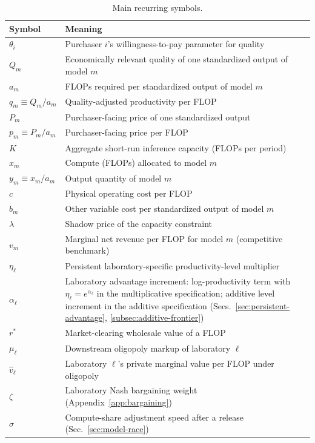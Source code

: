\documentclass[11pt]{article}
\begin{document}
\begin{table}[htbp]
\centering
\caption{Main recurring symbols.}
\label{tab:notation}
\begin{tabular}{l>{\raggedright\arraybackslash}p{4.4in}}
\hline
Symbol & Meaning \\
\hline
$\theta_i$ & Purchaser $i$'s willingness-to-pay parameter for quality \\
$Q_m$ & Economically relevant quality of one standardized output of model $m$ \\
$a_m$ & FLOPs required per standardized output of model $m$ \\
$q_m\equiv Q_m/a_m$ & Quality-adjusted productivity per FLOP \\
$P_m$ & Purchaser-facing price of one standardized output \\
$p_m\equiv P_m/a_m$ & Purchaser-facing price per FLOP \\
$K$ & Aggregate short-run inference capacity (FLOPs per period) \\
$x_m$ & Compute (FLOPs) allocated to model $m$ \\
$y_m\equiv x_m/a_m$ & Output quantity of model $m$ \\
$c$ & Physical operating cost per FLOP \\
$b_m$ & Other variable cost per standardized output of model $m$ \\
$\lambda$ & Shadow price of the capacity constraint \\
$v_m$ & Marginal net revenue per FLOP for model $m$ (competitive benchmark) \\
$\eta_\ell$ & Persistent laboratory-specific productivity-level multiplier \\
$\alpha_\ell$ & Laboratory advantage increment: log-productivity term with $\eta_\ell=e^{\alpha_\ell}$ in the multiplicative specification; additive level increment in the additive specification (Secs.~\ref{sec:persistent-advantage}, \ref{subsec:additive-frontier}) \\
$r^*$ & Market-clearing wholesale value of a FLOP \\
$\mu_\ell$ & Downstream oligopoly markup of laboratory $\ell$ \\
$\widehat v_\ell$ & Laboratory $\ell$'s private marginal value per FLOP under oligopoly \\
$\zeta$ & Laboratory Nash bargaining weight (Appendix~\ref{app:bargaining}) \\
$\sigma$ & Compute-share adjustment speed after a release (Sec.~\ref{sec:model-race}) \\

\end{tabular}
\end{table}
\end{document}
